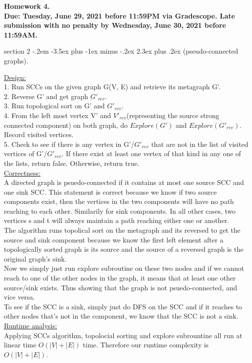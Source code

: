\documentclass{article}
\makeatletter
\newenvironment{problem}{\@startsection
       {section}
       {2}
       {-.2em}
       {-3.5ex plus -1ex minus -.2ex}
       {2.3ex plus .2ex}
       {\pagebreak[3]%
       \large\bf\noindent{Problem }
       }
       }
\makeatother
\begin{document}
{\bf \noindent Homework 4. \\ Due: Tuesday, June 29, 2021 before 11:59PM via Gradescope. Late submission with no penalty by Wednesday, June 30, 2021 before 11:59AM.}

\begin{problem}{(pseudo-connected graphs).}
 
\underline{Design:}\\
1. Run SCCs on the given graph G(V, E) and retrieve its metagraph G'.\\
2. Reverse G' and get graph \(G'_{rev}\). \\
3. Run topological sort on G' and \(G'_{rev}\). \\
4. From the left most vertex V' and \(V'_{rev}\)(representing the source strong connected component) on both graph, do \(Explore(G')\) and \(Explore(G'_{rev})\). Record visited vertices.\\
5. Check to see if there is any vertex in G'/\(G'_{rev}\) that are not in the list of visited vertices of G'/\(G'_{rev}\). If there exist at least one vertex of that kind in any one of the lists, return false. Otherwise, return true.\\
\underline{Correctness:}\\
A directed graph is psuedo-connected if it contains at most one source SCC and one sink SCC. This statement is correct because we know if two source components exist, then the vertices in the two components will have no path reaching to each other. Similarily for sink components. In all other cases, two vertices s and t will always maintain a path reaching either one or another. \\
The algorithm runs topolical sort on the metagraph and its reversed to get the source and sink component because we know the first left element after a topologically sorted graph is its source and the source of a reversed graph is the original graph's sink.\\
Now we simply just run explore subroutine on these two nodes and if we cannot reach to one of the other nodes in the graph, it means that at least one other source/sink exists. Thus showing that the graph is not psuedo-connected, and vice versa.\\
To see if the SCC is a sink, simply just do DFS on the SCC and if it reaches to other nodes that's not in the component, we know that the SCC is not a sink.\\
\underline{Runtime analysis:}\\
Applying SCCs algorithm, topolocial sorting and explore subrountine all run at linear time \(O(|V|+|E|)\) time. Therefore our runtime complexity is \(O(|V|+|E|)\).\\
\end{problem}
\end{document}
